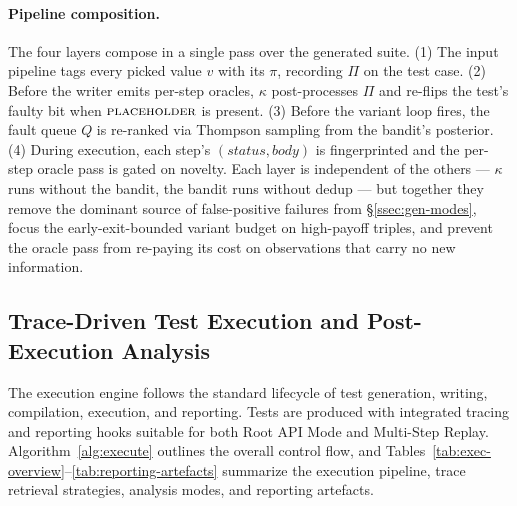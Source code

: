 \documentclass[conference]{IEEEtran}
\begin{document}
\paragraph{Pipeline composition.}
The four layers compose in a single pass over the generated suite. (1) The input pipeline tags every picked value $v$ with its $\pi$, recording $\Pi$ on the test case. (2) Before the writer emits per-step oracles, $\kappa$ post-processes $\Pi$ and re-flips the test's faulty bit when $\textsc{placeholder}$ is present. (3) Before the variant loop fires, the fault queue $Q$ is re-ranked via Thompson sampling from the bandit's posterior. (4) During execution, each step's $(\textit{status}, \textit{body})$ is fingerprinted and the per-step oracle pass is gated on novelty. Each layer is independent of the others --- $\kappa$ runs without the bandit, the bandit runs without dedup --- but together they remove the dominant source of false-positive failures from \S\ref{ssec:gen-modes}, focus the early-exit-bounded variant budget on high-payoff triples, and prevent the oracle pass from re-paying its cost on observations that carry no new information.

\subsection{Trace-Driven Test Execution and Post-Execution Analysis}
\label{ssec:exec}

The execution engine follows the standard lifecycle of test generation, writing, compilation, execution, and reporting. Tests are produced with integrated tracing and reporting hooks suitable for both Root API Mode and Multi-Step Replay. Algorithm~\ref{alg:execute} outlines the overall control flow, and Tables~\ref{tab:exec-overview}--\ref{tab:reporting-artefacts} summarize the execution pipeline, trace retrieval strategies, analysis modes, and reporting artefacts.
\end{document}
